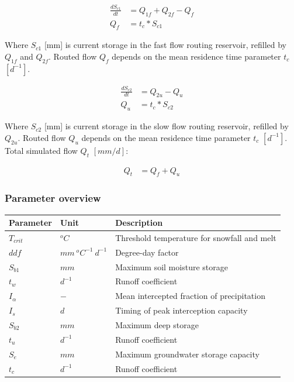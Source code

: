 \begin{align}
	\frac{dS_{c1}}{dt} &= Q_{1f}+Q_{2f}-Q_{f}\\
	Q_f &= t_c*S_{c1}
\end{align}

Where $S_{c1}$ [mm] is current storage in the fast flow routing reservoir, refilled by $Q_{1f}$ and $Q_{2f}$. Routed flow $Q_f$ depends on the mean residence time parameter $t_c$ $[d^{-1}]$.

\begin{align}
	\frac{dS_{c2}}{dt} &= Q_{2u}-Q_{u}\\
	Q_u &= t_c*S_{c2}
\end{align}

Where $S_{c2}$ [mm] is current storage in the slow flow routing reservoir, refilled by $Q_{2u}$. Routed flow $Q_u$ depends on the mean residence time parameter $t_c$ $[d^{-1}]$. Total simulated flow $Q_t$ $[mm/d]$:

\begin{align}
	Q_t &= Q_f + Q_u
\end{align}

\subsubsection{Parameter overview}
\begin{table}[htbp]
  \centering
    \begin{tabular}{lll}
    \toprule
    Parameter & Unit  & Description \\
    \midrule
    $T_{crit}$ & $^oC$ & Threshold temperature for snowfall and melt \\
    $ddf$ & $mm~^oC^{-1}~d^{-1}$ & Degree-day factor \\
    $S_{b1}$ & $mm$  & Maximum soil moisture storage \\
    $t_w$ & $d^{-1}$ & Runoff coefficient \\
    $I_{\alpha}$ & $-$   & Mean intercepted fraction of precipitation \\
    $I_{s}$ & $d$   & Timing of peak interception capacity \\
    $S_{b2}$ & $mm$  & Maximum deep storage \\
    $t_u$ & $d^{-1}$ & Runoff coefficient \\
    $S_e$ & $mm$  & Maximum groundwater storage capacity \\
    $t_c$ & $d^{-1}$ & Runoff coefficient \\
    \bottomrule
    \end{tabular}%
  \label{tab:addlabel}%
\end{table}%
